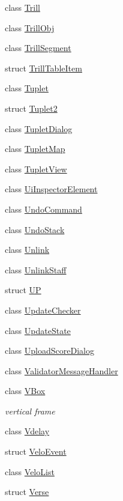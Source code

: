 \begin{DoxyCompactItemize}
class \hyperlink{class_ms_1_1_trill}{Trill}
\item 
class \hyperlink{class_ms_1_1_trill_obj}{Trill\+Obj}
\item 
class \hyperlink{class_ms_1_1_trill_segment}{Trill\+Segment}
\item 
struct \hyperlink{struct_ms_1_1_trill_table_item}{Trill\+Table\+Item}
\item 
class \hyperlink{class_ms_1_1_tuplet}{Tuplet}
\item 
struct \hyperlink{struct_ms_1_1_tuplet2}{Tuplet2}
\item 
class \hyperlink{class_ms_1_1_tuplet_dialog}{Tuplet\+Dialog}
\item 
class \hyperlink{class_ms_1_1_tuplet_map}{Tuplet\+Map}
\item 
class \hyperlink{class_ms_1_1_tuplet_view}{Tuplet\+View}
\item 
class \hyperlink{class_ms_1_1_ui_inspector_element}{Ui\+Inspector\+Element}
\item 
class \hyperlink{class_ms_1_1_undo_command}{Undo\+Command}
\item 
class \hyperlink{class_ms_1_1_undo_stack}{Undo\+Stack}
\item 
class \hyperlink{class_ms_1_1_unlink}{Unlink}
\item 
class \hyperlink{class_ms_1_1_unlink_staff}{Unlink\+Staff}
\item 
struct \hyperlink{struct_ms_1_1_u_p}{UP}
\item 
class \hyperlink{class_ms_1_1_update_checker}{Update\+Checker}
\item 
class \hyperlink{class_ms_1_1_update_state}{Update\+State}
\item 
class \hyperlink{class_ms_1_1_upload_score_dialog}{Upload\+Score\+Dialog}
\item 
class \hyperlink{class_ms_1_1_validator_message_handler}{Validator\+Message\+Handler}
\item 
class \hyperlink{class_ms_1_1_v_box}{V\+Box}
\begin{DoxyCompactList}\small\item\em vertical frame \end{DoxyCompactList}\item 
class \hyperlink{class_ms_1_1_vdelay}{Vdelay}
\item 
struct \hyperlink{struct_ms_1_1_velo_event}{Velo\+Event}
\item 
class \hyperlink{class_ms_1_1_velo_list}{Velo\+List}
\item 
struct \hyperlink{struct_ms_1_1_verse}{Verse}

\end{DoxyCompactItemize}

